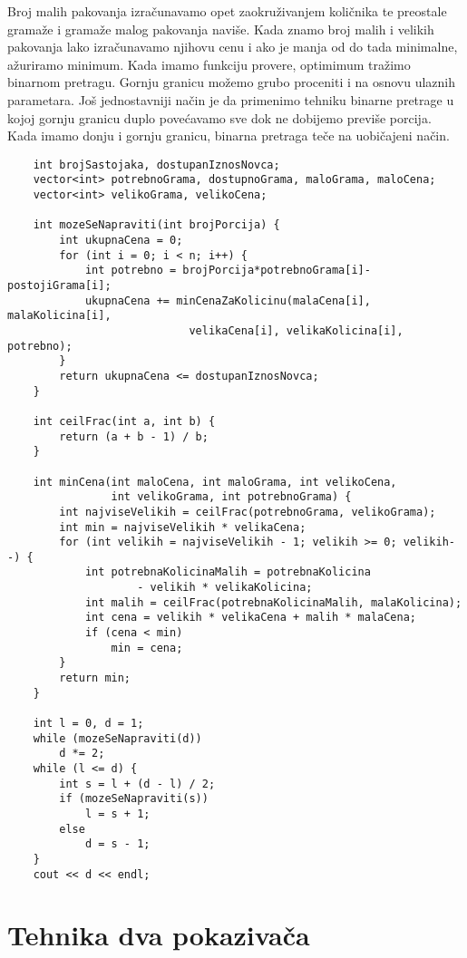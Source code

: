 \documentclass{article}
\begin{document}
Broj malih pakovanja izračunavamo opet zaokruživanjem količnika te preostale
gramaže i gramaže malog pakovanja naviše. Kada znamo broj malih i velikih
pakovanja lako izračunavamo njihovu cenu i ako je manja od do tada minimalne,
ažuriramo minimum.
\newline
Kada imamo funkciju provere, optimimum tražimo binarnom pretragu. Gornju
granicu možemo grubo proceniti i na osnovu ulaznih parametara. Još jednostavniji način je da primenimo tehniku binarne
pretrage u kojoj gornju granicu duplo povećavamo sve dok ne dobijemo previše
porcija. Kada imamo donju i gornju granicu, binarna pretraga teče na uobičajeni
način.
\begin{lstlisting}
    int brojSastojaka, dostupanIznosNovca;
    vector<int> potrebnoGrama, dostupnoGrama, maloGrama, maloCena;
    vector<int> velikoGrama, velikoCena;
    
    int mozeSeNapraviti(int brojPorcija) {
        int ukupnaCena = 0;
        for (int i = 0; i < n; i++) {
            int potrebno = brojPorcija*potrebnoGrama[i]-postojiGrama[i];
            ukupnaCena += minCenaZaKolicinu(malaCena[i], malaKolicina[i],
                            velikaCena[i], velikaKolicina[i], potrebno);
        }
        return ukupnaCena <= dostupanIznosNovca;
    }
    
    int ceilFrac(int a, int b) {
        return (a + b - 1) / b;
    }
    
    int minCena(int maloCena, int maloGrama, int velikoCena, 
                int velikoGrama, int potrebnoGrama) {
        int najviseVelikih = ceilFrac(potrebnoGrama, velikoGrama);
        int min = najviseVelikih * velikaCena;
        for (int velikih = najviseVelikih - 1; velikih >= 0; velikih--) {
            int potrebnaKolicinaMalih = potrebnaKolicina 
                    - velikih * velikaKolicina;
            int malih = ceilFrac(potrebnaKolicinaMalih, malaKolicina);
            int cena = velikih * velikaCena + malih * malaCena;
            if (cena < min)
                min = cena;
        }
        return min;
    }
    
    int l = 0, d = 1;
    while (mozeSeNapraviti(d))
        d *= 2;
    while (l <= d) {
        int s = l + (d - l) / 2;
        if (mozeSeNapraviti(s))
            l = s + 1;
        else
            d = s - 1;
    }
    cout << d << endl;
\end{lstlisting}

\newpage

\section{Tehnika dva pokazivača}
\end{document}
